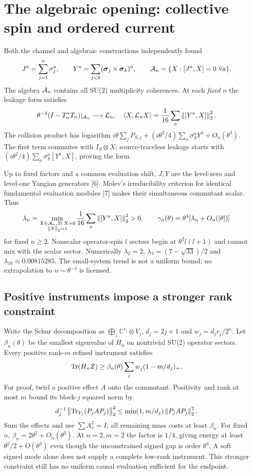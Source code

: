 \section{The algebraic opening: collective spin and ordered current}
Both the channel and algebraic constructions independently found
\[
 J^a=\sum_{j=1}^n\sigma_j^a,\qquad
 Y^a=\sum_{j<k}(\boldsymbol\sigma_j\times\boldsymbol\sigma_k)^a,
 \qquad\mathcal A_n=\{X:[J^a,X]=0\ \forall a\}.
\]
The algebra $\mathcal A_n$ contains all SU(2) multiplicity coherences. At each
\emph{fixed} $n$ the leakage form satisfies
\begin{equation}
 \theta^{-4}(I-T_n^*T_n)|_{\mathcal A_n}\longrightarrow\mathcal L_n,
 \quad\langle X,\mathcal L_nX\rangle=\frac1{16}\sum_a\left\lVert[Y^a,X]\right\rVert_2^2.
 \label{eq:yangian}
\end{equation}
The collision product has logarithm
$i\theta\sum_jP_{S,j}+(i\theta^2/4)\sum_a\sigma_S^aY^a+O_n(\theta^3)$.
The first term commutes with $I_S\otimes X$; source-traceless leakage starts
with $(i\theta^2/4)\sum_a\sigma_S^a[Y^a,X]$, proving the form.

Up to fixed factors and a common evaluation shift, $J,Y$ are the level-zero
and level-one Yangian generators [6]. Molev's irreducibility criterion for
identical fundamental evaluation modules [7] makes their simultaneous
commutant scalar. Thus
\[
 \lambda_n=\min_{\substack{X\in\mathcal A_n,\operatorname{Tr} X=0\\\left\lVert X\right\rVert_2=1}}
 \frac1{16}\sum_a\left\lVert[Y^a,X]\right\rVert_2^2>0,
 \qquad\gamma_n(\theta)=\theta^4[\lambda_n+O_n(|\theta|)]
\]
for fixed $n\ge2$. Nonscalar operator-spin $l$ sectors begin at
$\theta^2l(l+1)$ and cannot mix with the scalar sector. Numerically
$\lambda_2=2$, $\lambda_3=(7-\sqrt{33})/2$ and
$\lambda_{10}\approx0.00815285$. The small-system trend is not a uniform
bound; no extrapolation to $n\sim\theta^{-4}$ is licensed.

\subsection{Positive instruments impose a stronger rank constraint}
Write the Schur decomposition as $\bigoplus_j\mathbb C^{r_j}\otimes V_j$,
$d_j=2j+1$ and $w_j=d_jr_j/2^n$. Let $\beta_n(\theta)$ be the smallest
eigenvalue of $H_n$ on nontrivial SU(2) operator sectors. Every positive
rank-$m$ refined instrument satisfies
\begin{equation}
 \operatorname{Tr}(H_nZ)\ge\beta_n(\theta)\sum_jw_j(1-m/d_j)_+.\label{eq:rankspin}
\end{equation}
For proof, twirl a positive effect $A$ onto the commutant. Positivity and rank
at most $m$ bound its block-$j$ squared norm by
\[
 d_j^{-1}\left\lVert\operatorname{Tr}_{V_j}(P_jAP_j)\right\rVert_2^2
 \le\min(1,m/d_j)\left\lVert P_jAP_j\right\rVert_2^2.
\]
Sum the effects and use
$\sum A_x^2=I$; all remaining mass costs at least $\beta_n$.
For fixed $n$, $\beta_n=2\theta^2+O_n(\theta^3)$. At $n=2,m=2$ the factor
is $1/4$, giving energy at least $\theta^2/2+O(\theta^3)$ even though the
unconstrained signed gap is order $\theta^4$. A soft signed mode alone does
not supply a complete low-rank instrument. This stronger constraint still
has no uniform causal evaluation sufficient for the endpoint.

